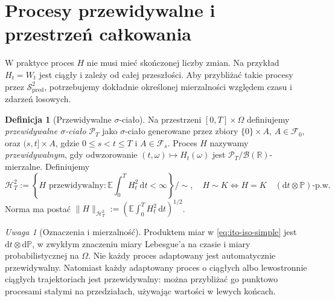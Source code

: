 \documentclass[11pt,a4paper,oneside]{report}
\numberwithin{equation}{chapter}
\theoremstyle{plain}
\theoremstyle{definition}
\newtheorem{definicja}{Definicja}[chapter]
\theoremstyle{remark}
\newtheorem{uwaga}{Uwaga}[chapter]
\newcommand{\R}{\mathbb{R}}
\newcommand{\Prob}{\mathbb{P}}
\newcommand{\E}{\mathbb{E}}
\newcommand{\calF}{\mathcal{F}}
\newcommand{\calH}{\mathcal{H}}
\newcommand{\calB}{\mathcal{B}}
\newcommand{\calP}{\mathcal{P}}
\newcommand{\calS}{\mathcal{S}}
\newcommand{\dd}{\mathrm{d}}
\newcommand{\norm}[1]{\lVert #1\rVert}
\begin{document}
\section{Procesy przewidywalne i przestrzeń całkowania}\label{sec:volIII:02:03}
W praktyce proces $H$ nie musi mieć skończonej liczby zmian.
Na przykład $H_t=W_t$ jest ciągły i zależy od całej
przeszłości. Aby przybliżać takie procesy przez
$\calS_{\mathrm{pred}}^2$, potrzebujemy dokładnie określonej
mierzalności względem czasu i zdarzeń losowych.

\begin{definicja}[Przewidywalne $\sigma$-ciało]\label{def:volIII:02:03}
Na przestrzeni $[0,T]\times\Omega$ definiujemy
\emph{przewidywalne $\sigma$-ciało} $\calP_T$ jako
$\sigma$-ciało generowane przez zbiory
$\{0\}\times A$, $A\in\calF_0$, oraz
$(s,t]\times A$, gdzie $0\le s<t\le T$ i $A\in\calF_s$.
Proces $H$ nazywamy \emph{przewidywalnym}, gdy odwzorowanie
$(t,\omega)\mapsto H_t(\omega)$ jest
$\calP_T/\calB(\R)$-mierzalne.
Definiujemy
\[
\calH_T^2:=\left\{H\text{ przewidywalny}:
\E\int_0^T H_t^2\,\dd t<\infty\right\}\big/\sim,
\quad H\sim K\iff H=K\quad
(\dd t\otimes\Prob)\text{-p.w.}
\tag{2.5}
\]
Norma ma postać
$\norm{H}_{\calH_T^2}:=(\E\int_0^TH_t^2\,\dd t)^{1/2}$.
\end{definicja}

\begin{uwaga}[Oznaczenia i mierzalność]
Produktem miar w \eqref{eq:ito-iso-simple} jest
$\dd t\otimes\dd\Prob$, w zwykłym znaczeniu miary
Lebesgue'a na czasie i miary probabilistycznej na $\Omega$.
Nie każdy proces adaptowany jest automatycznie przewidywalny.
Natomiast każdy adaptowany proces o ciągłych albo
lewostronnie ciągłych trajektoriach jest przewidywalny:
można przybliżać go punktowo procesami stałymi na
przedziałach, używając wartości w lewych końcach.
\end{uwaga}
\end{document}
